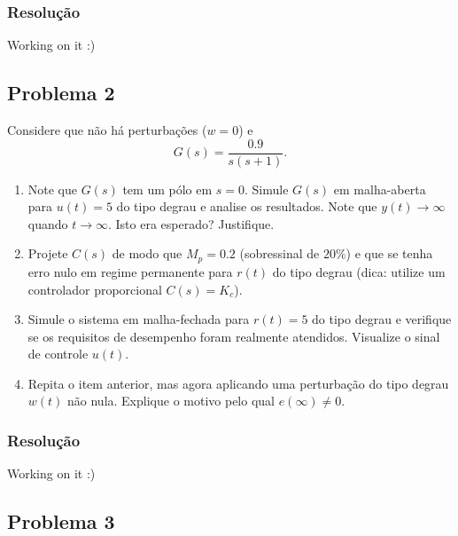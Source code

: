 \documentclass[
]{book}
\providecommand{\tightlist}{%
  \setlength{\itemsep}{0pt}\setlength{\parskip}{0pt}}
\begin{document}
\hypertarget{resoluuxe7uxe3o-12}{%
\subsubsection*{Resolução}\label{resoluuxe7uxe3o-12}}

Working on it :)

\hypertarget{problema-2-3}{%
\subsection*{Problema 2}\label{problema-2-3}}

Considere que não há perturbações (\(w=0\)) e
\[
G(s) = \frac{0.9}{s(s+1)}.
\]

\begin{enumerate}
\def\labelenumi{(\alph{enumi})}
\tightlist
\item
  Note que \(G(s)\) tem um pólo em \(s=0\). Simule \(G(s)\) em malha-aberta para \(u(t) = 5\) do tipo degrau e analise os resultados. Note que \(y(t) \to \infty\) quando \(t \to \infty\). Isto era esperado? Justifique.
\item
  Projete \(C(s)\) de modo que \(M_p = 0.2\) (sobressinal de \(20\%\)) e que se tenha erro nulo em regime permanente para \(r(t)\) do tipo degrau (dica: utilize um controlador proporcional \(C(s) = K_c\)).
\item
  Simule o sistema em malha-fechada para \(r(t) = 5\) do tipo degrau e verifique se os requisitos de desempenho foram realmente atendidos. Visualize o sinal de controle \(u(t)\).
\item
  Repita o item anterior, mas agora aplicando uma perturbação do tipo degrau \(w(t)\) não nula. Explique o motivo pelo qual \(e(\infty) \neq 0\).
\end{enumerate}

\hypertarget{resoluuxe7uxe3o-13}{%
\subsubsection*{Resolução}\label{resoluuxe7uxe3o-13}}

Working on it :)

\hypertarget{problema-3-3}{%
\subsection*{Problema 3}\label{problema-3-3}}
\end{document}
